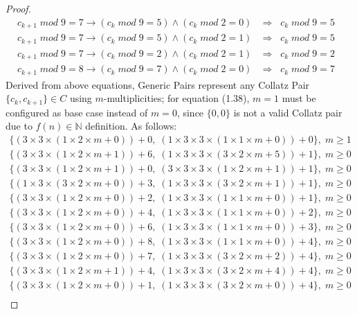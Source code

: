 \documentclass{jams-l}
\theoremstyle{definition}
\theoremstyle{remark}
\numberwithin{equation}{section}
\begin{document}
\begin{proof}
\begin{align}
    			c_{k+1}\;mod\;9=7\rightarrow (c_{k}\;mod\;9=5)\land (c_{k}\;mod\;2=0) & \Longrightarrow \;\;c_{k}\;mod\;9 = 5&\\
    			c_{k+1}\;mod\;9=7\rightarrow (c_{k}\;mod\;9=5)\land (c_{k}\;mod\;2=1) & \Longrightarrow \;\;c_{k}\;mod\;9 = 5&\\
    			c_{k+1}\;mod\;9=7\rightarrow (c_{k}\;mod\;9=2)\land (c_{k}\;mod\;2=1) & \Longrightarrow \;\;c_{k}\;mod\;9 = 2&\\
    			c_{k+1}\;mod\;9=8\rightarrow (c_{k}\;mod\;9=7)\land (c_{k}\;mod\;2=0) & \Longrightarrow \;\;c_{k}\;mod\;9 = 7&
    		\end{align}
    		Derived from above equations, Generic Pairs represent any Collatz Pair $\{c_{k},c_{k+1}\}\in C$ using $m$-multiplicities; for equation (1.38), $m=1$ must be configured as base case instead of $m=0$, since $\{0,0\}$ is not a valid Collatz pair due to $f(n) \in \mathbb{N}$ definition. As follows:
    		\begin{align}
    			\{(3\times3\times(1\times2\times m+0)) + 0,\;(1\times3\times3\times(1\times1\times m+0)) + 0\},\;m \geq 1\\
    			\{(3\times3\times(1\times2\times m+1)) + 6,\;(1\times3\times3\times(3\times2\times m+5)) + 1\},\;m \geq 0\\
    			\{(3\times3\times(1\times2\times m+1)) + 0,\;(3\times3\times3\times(1\times2\times m+1)) + 1\},\;m \geq 0\\
    			\{(1\times3\times(3\times2\times m+0)) + 3,\;(1\times3\times3\times(3\times2\times m+1)) + 1\},\;m \geq 0\\
    			\{(3\times3\times(1\times2\times m+0)) + 2,\;(1\times3\times3\times(1\times1\times m+0)) + 1\},\;m \geq 0\\
    			\{(3\times3\times(1\times2\times m+0)) + 4,\;(1\times3\times3\times(1\times1\times m+0)) + 2\},\;m \geq 0\\
    			\{(3\times3\times(1\times2\times m+0)) + 6,\;(1\times3\times3\times(1\times1\times m+0)) + 3\},\;m \geq 0\\
       			\{(3\times3\times(1\times2\times m+0)) + 8,\;(1\times3\times3\times(1\times1\times m+0)) + 4\},\;m \geq 0\\
                \{(3\times3\times(1\times2\times m+0)) + 7,\;(1\times3\times3\times(3\times2\times m+2)) + 4\},\;m \geq 0\\
    			\{(3\times3\times(1\times2\times m+1)) + 4,\;(1\times3\times3\times(3\times2\times m+4)) + 4\},\;m \geq 0\\
    			\{(3\times3\times(1\times2\times m+0)) + 1,\;(1\times3\times3\times(3\times2\times m+0)) + 4\},\;m \geq 0\\

\end{align}
\end{proof}
\end{document}

